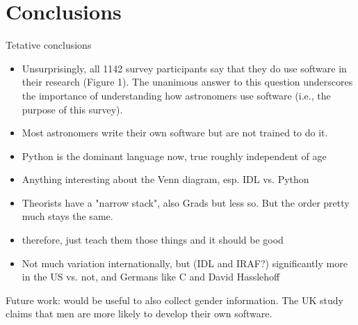 
\section{Conclusions}
\label{sec:conc}


Tetative conclusions



\begin{itemize}
\item Unsurprisingly, all 1142 survey participants say that they do use software in their research (Figure 1). The unanimous answer to this question underscores the importance of understanding how astronomers use software (i.e., the purpose of this survey).
\item Most astronomers write their own software but are not trained to do it.
\item Python is the dominant language now, true roughly independent of age
\item Anything interesting about the Venn diagram, esp. IDL vs. Python
\item Theorists have a "narrow stack", also Grads but less so.  But the order pretty much stays the same.
\item therefore, just teach them those things and it should be good
\item Not much variation internationally, but (IDL and IRAF?) significantly more in the US vs. not, and Germans like C and David Hasslehoff
\end{itemize}

Future work: would be useful to also collect gender information. The UK study claims that men are more likely to develop their own software. 